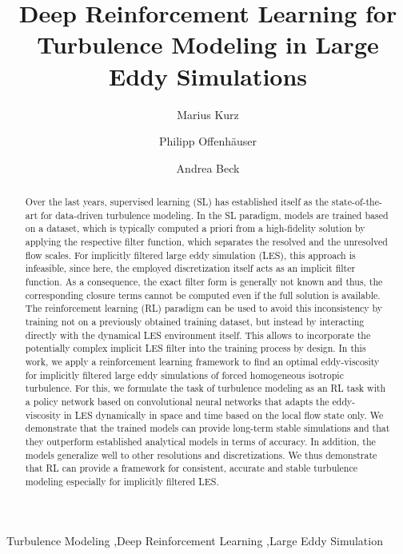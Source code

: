 \documentclass[final,5p]{elsarticle}
\begin{document}
\begin{frontmatter}



\title{Deep Reinforcement Learning for Turbulence Modeling in Large Eddy Simulations}

\author[label1]{Marius Kurz}

\author[label2]{Philipp Offenh\"auser}

\author[label1]{Andrea Beck}

\address[label1]{Institute of Aerodynamics and Gas Dynamics, University of Stuttgart, Pfaffenwaldring 21, 70569 Stuttgart, Germany}
\address[label2]{Hewlett Packard Enterprise (HPE), Herrenberger Straße 140, 71034  Böblingen, Germany}



\begin{abstract}

  Over the last years, supervised learning (SL) has established itself as the state-of-the-art for data-driven turbulence modeling.
  In the SL paradigm, models are trained based on a dataset, which is typically computed a priori from a high-fidelity solution by applying the respective filter function, which separates the resolved and the unresolved flow scales.
  For implicitly filtered large eddy simulation (LES), this approach is infeasible, since here, the employed discretization itself acts as an implicit filter function.
  As a consequence, the exact filter form is generally not known and thus, the corresponding closure terms cannot be computed even if the full solution is available.
  The reinforcement learning (RL) paradigm can be used to avoid this inconsistency by training not on a previously obtained training dataset, but instead by interacting directly with the dynamical LES environment itself.
  This allows to incorporate the potentially complex implicit LES filter into the training process by design.
  In this work, we apply a reinforcement learning framework to find an optimal eddy-viscosity for implicitly filtered large eddy simulations of forced homogeneous isotropic turbulence.
  For this, we formulate the task of turbulence modeling as an RL task with a policy network based on convolutional neural networks that adapts the eddy-viscosity in LES dynamically in space and time based on the local flow state only.
  We demonstrate that the trained models can provide long-term stable simulations and that they outperform established analytical models in terms of accuracy.
  In addition, the models generalize well to other resolutions and discretizations.
  We thus demonstrate that RL can provide a framework for consistent, accurate and stable turbulence modeling especially for implicitly filtered LES.
\end{abstract}



\begin{keyword}
  Turbulence Modeling \sep Deep Reinforcement Learning \sep Large Eddy Simulation
\end{keyword}

\end{frontmatter}
\end{document}
